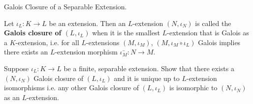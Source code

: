 \documentclass[../book.tex]{subfiles}
\begin{document}
\begin{ex} Galois Closure of a Separable Extension.
    
    Let $\iota_L : K \to L$ be an extension.
    Then an $L$-extension $(N,\iota_N)$ is called 
    the \textbf{Galois closure of $(L,\iota_L)$} 
    when it is the smallest $L$-extension that is Galois as a $K$-extension,
    i.e. for all $L$-extensions $(M,\iota_M)$,
    $(M,\iota_M\circ\iota_L)$ Galois implies
    there exists an $L$-extension morphism $\bar{\iota_M} : N \to M$. 
    
    Suppose $\iota_L : K \to L$ be a finite, separable extension. 
    Show that there exists a $(N,\iota_N)$ Galois closure of $(L,\iota_L)$
    and it is unique up to $L$-extension isomorphisms i.e.
    any other Galois closure of $(L,\iota_L)$ is isomorphic to $(N,\iota_N)$
    as an $L$-extension. 
    
\end{ex}

\end{document}
